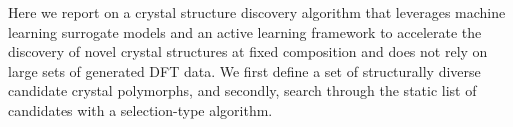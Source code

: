 %
%
Here we report on a crystal structure discovery algorithm that leverages machine learning surrogate models and an active learning framework to accelerate the discovery of novel crystal structures at fixed composition and does not rely on large sets of generated DFT data.
%
%
We first define a set of structurally diverse candidate crystal polymorphs, and secondly, search through the static list of candidates with a selection-type algorithm.
%
%
%



